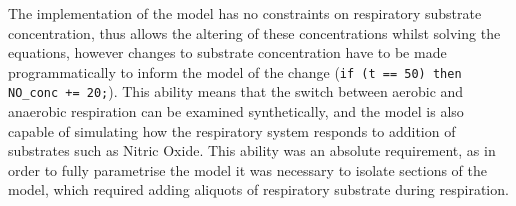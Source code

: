 The implementation of the model has no constraints on respiratory substrate concentration, thus allows the altering of these concentrations whilst solving the equations, however changes to substrate concentration have to be made programmatically to inform the model of the change (\texttt{if (t == 50) then NO\_conc += 20;}). This ability means that the switch between aerobic and anaerobic respiration can be examined synthetically, and the model is also capable of simulating how the respiratory system responds to addition of substrates such as Nitric Oxide. This ability was an absolute requirement, as in order to fully parametrise the model it was necessary to isolate sections of the model, which required adding aliquots of respiratory substrate during respiration.